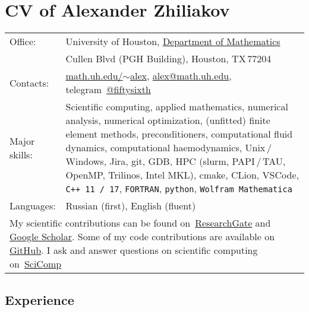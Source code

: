 \documentclass[a4paper,12pt]{article}
\begin{document}
	\section*{CV of Alexander Zhiliakov}
	
	\begin{longtable}{ l >{\raggedright\arraybackslash}p{15cm} }
		Office:			& University of Houston, \href{http://www.uh.edu/nsm/math/}{Department of Mathematics}\\
		\phantom{Summer 2018} & 3551 Cullen Blvd (PGH Building), Houston, TX\,77204\vspace{1mm}\\
		Contacts:		& \href{https://www.math.uh.edu/~alex}{math.uh.edu/${\sim}$alex}, \href{mailto:alex@math.uh.edu}{alex@math.uh.edu}, telegram~\href{https://telegram.me/fiftysixth}{@fiftysixth}\vspace{1mm}\\
		Major skills:	& Scientific computing, applied mathematics, numerical analysis, numerical optimization, (unfitted) finite element methods, preconditioners, computational fluid dynamics, computational haemodynamics, Unix\,/\,Windows, Jira, git, GDB, HPC (slurm, PAPI\,/\,TAU, OpenMP, Trilinos, Intel MKL), cmake, CLion, VSCode, \texttt{C++\,11\,/\,17}, \texttt{FORTRAN}, \texttt{python}, \texttt{Wolfram Mathematica}\vspace{1mm}\\
		Languages:		& Russian (first), English (fluent)\vspace{3mm}\\
		\multicolumn{2}{p{17cm}}{My scientific contributions can be found on~\href{https://www.researchgate.net/profile/Alexander_Zhiliakov}{ResearchGate} and \href{https://scholar.google.com/citations?user=wchxEFUAAAAJ}{Google Scholar}. Some of my code contributions are available on \href{https://github.com/56th}{GitHub}. I ask and answer questions on scientific computing on~\href{https://scicomp.stackexchange.com/users/21916/56th}{SciComp}}\\
	\end{longtable} 
	
	\subsection*{Experience}
	
\end{document}
